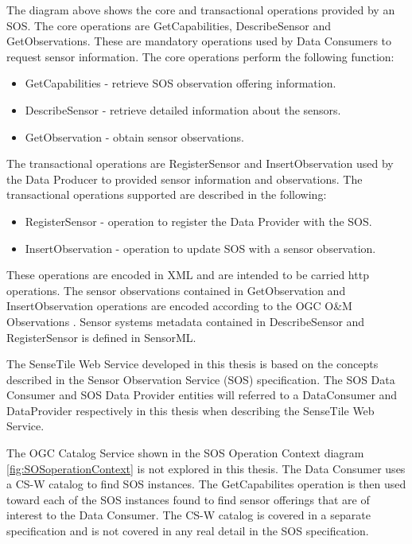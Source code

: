 \documentclass[]{final_report}
\begin{document}
The diagram above shows the core and transactional operations provided by an SOS. The core operations are GetCapabilities, DescribeSensor and GetObservations. These are mandatory operations used by Data Consumers to request sensor information.  The core operations perform the following function:
 \begin{itemize}
\item GetCapabilities  -    retrieve SOS observation offering information.
\item DescribeSensor -    retrieve detailed information about the sensors.
\item GetObservation -   obtain sensor observations.
\end{itemize}

The transactional operations are RegisterSensor and InsertObservation used by the Data Producer to provided sensor information and observations. The transactional operations supported are described in the following:
 \begin{itemize}
\item RegisterSensor - operation to register the Data Provider with the SOS.
\item InsertObservation - operation to update SOS with a sensor observation.
\end{itemize}

These operations are encoded in XML and are intended to be carried http  operations. The sensor observations contained in  GetObservation and InsertObservation operations are encoded according to the OGC O\&M Observations \cite{OMref}. Sensor systems metadata contained in DescribeSensor and RegisterSensor is defined in SensorML.

The SenseTile Web Service developed in this thesis is based on the concepts described in the Sensor Observation Service (SOS) specification. The SOS Data Consumer and SOS Data Provider entities will referred to a DataConsumer and DataProvider respectively in this thesis when describing the SenseTile Web Service.
 
The OGC Catalog Service shown in the SOS Operation Context diagram \ref{fig:SOSoperationContext} is not explored in this thesis. The Data Consumer uses a CS-W catalog to find SOS instances. The GetCapabilites operation is then used toward each of the SOS instances found to find sensor offerings that are of interest to the Data Consumer. The CS-W catalog is covered in a separate specification \cite{OGCcatref} and is not covered in any real detail in the SOS specification. 
\end{document}

